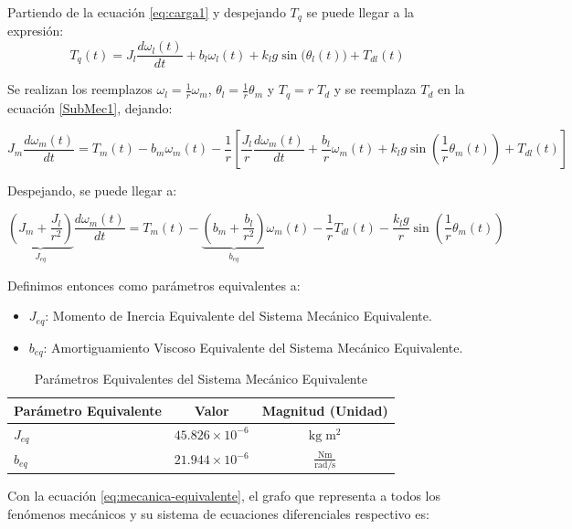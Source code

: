 \documentclass[blue,fullpaper]{ludusofficial}  %
\begin{document}
Partiendo de la ecuación \eqref{eq:carga1} y despejando $T_q$ se puede llegar a la expresión:
\[
T_{q}(t) = J_{l} \frac{d\omega_{l}(t)}{dt} + b_{l}\omega_{l}(t) + k_{l}g\sin \big(\theta_{l}(t)\big) +T_{dl}(t)
\]

Se realizan los reemplazos $\omega_l=\frac{1}{r}\omega_m$, $\theta_l=\frac{1}{r}\theta_m$ y $T_q=r \; T_d$ y se reemplaza $T_d$ en la ecuación \eqref{SubMec1}, dejando:

\[
J_{m} \frac{d\omega_{m}(t)}{dt} = T_{m}(t) - b_{m}\omega_{m}(t) - \frac{1}{r} \left[ \frac{J_{l}}{r} \frac{d\omega_{m}(t)}{dt} + \frac{b_{l}}{r} \omega_{m}(t) + k_{l} g \sin \left( \frac{1}{r} \theta_{m}(t) \right) + T_{dl}(t) \right]
\]

Despejando, se puede llegar a:

\begin{equation}
\label{eq:mecanica-equivalente}
\underbrace{ \left( J_{m}+\frac{J_{l}}{r^{2}} \right)  }_{ J_{eq} } \frac{d\omega_{m}(t)}{dt} = T_{m}(t) - \underbrace{ \left( b_{m} + \frac{b_{l}}{r^{2}} \right) }_{ b_{eq} }  \omega_{m}(t) -  \frac{1}{r} T_{dl}(t)  - \frac{k_{l}g}{r} \sin \left(  \frac{1}{r} \theta_{m}(t) \right)
\end{equation}

Definimos entonces como parámetros equivalentes a:

\begin{itemize}
    \item$J_{eq}$: Momento de Inercia Equivalente del Sistema Mecánico Equivalente.
    \item$b_{eq}$: Amortiguamiento Viscoso Equivalente del Sistema Mecánico Equivalente.
\end{itemize}

\begin{table}[htbp]
    \centering
    \caption{Parámetros Equivalentes del Sistema Mecánico Equivalente}
    \small
    \begin{tabular}{lcc}
        \hline
        \textbf{Parámetro Equivalente} & \textbf{Valor} & \textbf{Magnitud (Unidad)} \\
        \hline
        $J_{eq}$ & $45.826 \times 10^{-6}$ & $\mathrm{\mathrm{kg \; m^2}}$ \\
        $b_{eq}$ & $21.944 \times 10^{-6}$ & $\mathrm{\mathrm{\frac{Nm}{rad/s}}}$ \\
        \hline
    \end{tabular}
\end{table}

Con la ecuación \eqref{eq:mecanica-equivalente}, el grafo que representa a todos los fenómenos mecánicos y su sistema de ecuaciones diferenciales respectivo es:
\end{document}
